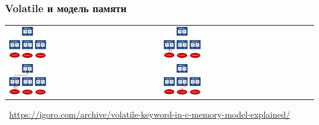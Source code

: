 \documentclass[xetex,mathserif,serif]{beamer}
\newcommand{\attribution}[1] {
\vspace{-5mm}\begin{flushright}\begin{scriptsize}\textcolor{gray}{\textcopyright\, #1}\end{scriptsize}\end{flushright}
}
\begin{document}
    \begin{frame}
        \frametitle{Volatile и модель памяти}
            \begin{center}
                \begin{tabu} {X[1 c p] X[1 c p]}
                    \includegraphics[width=0.25\textwidth]{volatile1.png} & \includegraphics[width=0.25\textwidth]{volatile2.png} \\
                    \includegraphics[width=0.25\textwidth]{volatile3.png} & \includegraphics[width=0.25\textwidth]{volatile4.png} \\
                \end{tabu}
                \attribution{\url{https://igoro.com/archive/volatile-keyword-in-c-memory-model-explained/}}
            \end{center}
    \end{frame}
\end{document}

